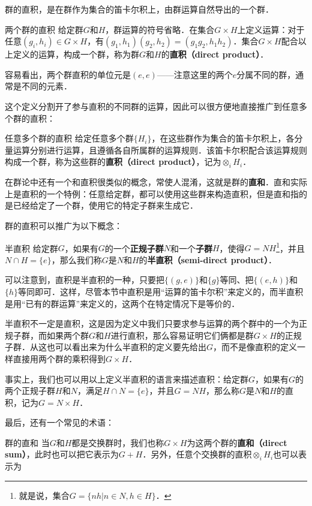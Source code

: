 
群的直积，是在群作为集合的笛卡尔积上，由群运算自然导出的一个群．

\begin{definition}{两个群的直积}
给定群$G$和$H$，群运算的符号省略．在集合$G\times H$上定义运算：对于任意$(g_i, h_i)\in G\times H$，有$(g_1, h_1)(g_2, h_2)=(g_1g_2, h_1h_2)$．集合$G\times H$配合以上定义的运算，构成一个群，称为群$G$和$H$的\textbf{直积（direct product）}．
\end{definition}

容易看出，两个群直积的单位元是$(e, e)$——注意这里的两个$e$分属不同的群，通常是不同的元素．

这个定义分割开了参与直积的不同群的运算，因此可以很方便地直接推广到任意多个群的直积：

\begin{definition}{任意多个群的直积}
给定任意多个群$\{H_i\}$，在这些群作为集合的笛卡尔积上，各分量运算分别进行运算，且遵循各自所属群的运算规则．该笛卡尔积配合该运算规则构成一个群，称为这些群的\textbf{直积（direct product）}，记为$\otimes_iH_i$．
\end{definition}

在群论中还有一个和直积很类似的概念，常使人混淆，这就是群的\textbf{直和}．直和实际上是直积的一个特例：任意给定群，都可以使用这些群来构造直积，但是直和指的是已经给定了一个群，使用它的特定子群来生成它．

群的直积可以推广为以下概念：

\begin{definition}{半直积}
给定群$G$，如果有$G$的一个\textbf{正规子群}$N$和一个\textbf{子群}$H$，使得$G=NH$\footnote{就是说，集合$G=\{nh|n\in N, h\in H\}$．}，并且$N\cap H=\{e\}$，那么我们称$G$是$N$和$H$的\textbf{半直积（semi-direct product）}．
\end{definition}

可以注意到，直积是半直积的一种，只要把$\{(g, e)\}$和$\{g\}$等同、把$\{(e, h)\}$和$\{h\}$等同即可．这样，尽管本节中直积是用“运算的笛卡尔积”来定义的，而半直积是用“已有的群运算”来定义的，这两个在特定情况下是等价的．

半直积不一定是直积，这是因为定义中我们只要求参与运算的两个群中的一个为正规子群，而如果两个群$G$和$H$进行直积，那么容易证明它们俩都是群$G\times H$的正规子群．从这也可以看出来为什么半直积的定义要先给出$G$，而不是像直积的定义一样直接用两个群的乘积得到$G\times H$．

事实上，我们也可以用以上定义半直积的语言来描述直积：给定群$G$，如果有$G$的两个正规子群$H$和$N$，满足$H\cap N=\{e\}$，并且$G=NH$，那么称$G$是$N$和$H$的直积，记为$G=N\times H$．

最后，还有一个常见的术语：

\begin{definition}{群的直和}
当$G$和$H$都是交换群时，我们也称$G\times H$为这两个群的\textbf{直和（direct sum）}，此时也可以把它表示为$G+H$．另外，任意个交换群的直积$\otimes_iH_i$也可以表示为$$
\end{definition}











